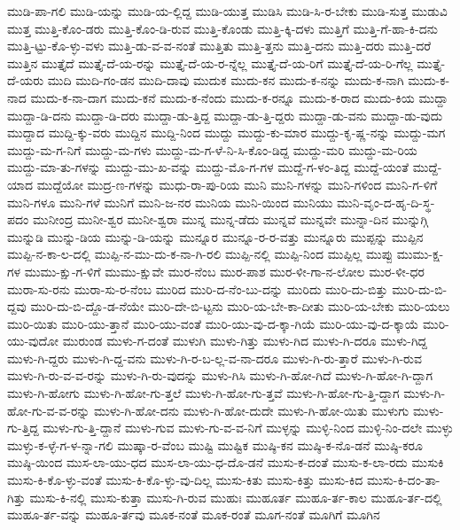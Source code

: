 {ಮುಡಿ-ಪಾ-ಗಲಿ
ಮುಡಿ-ಯನ್ನು
ಮುಡಿ-ಯ-ಲ್ಲಿದ್ದ
ಮುಡಿ-ಯುತ್ತ
ಮುಡಿಸಿ
ಮುಡಿ-ಸಿ-ರ-ಬೇಕು
ಮುಡಿ-ಸುತ್ತ
ಮುಡುವಿ
ಮುತ್ತ
ಮುತ್ತಿ-ಕೊಂ-ಡರು
ಮುತ್ತಿ-ಕೊಂ-ಡಿ-ರುವ
ಮುತ್ತಿ-ಕೊಂಡು
ಮುತ್ತಿ-ಕ್ಕಿ-ದಳು
ಮುತ್ತಿಗೆ
ಮುತ್ತಿ-ಗೆ-ಹಾ-ಕಿ-ದನು
ಮುತ್ತಿ-ಟ್ಟು-ಕೊ-ಳ್ಳು-ವಳು
ಮುತ್ತಿ-ಡು-ವ-ವ-ನಂತೆ
ಮುತ್ತಿತು
ಮುತ್ತಿ-ತ್ತನು
ಮುತ್ತಿ-ದನು
ಮುತ್ತಿ-ದರು
ಮುತ್ತಿ-ದರೆ
ಮುತ್ತಿನ
ಮುತ್ತೈದೆ
ಮುತ್ತೈ-ದೆ-ಯ-ರನ್ನು
ಮುತ್ತೈ-ದೆ-ಯ-ರ-ನ್ನೆಲ್ಲ
ಮುತ್ತೈ-ದೆ-ಯ-ರಿಗೆ
ಮುತ್ತೈ-ದೆ-ಯ-ರಿ-ಗೆಲ್ಲ
ಮುತ್ತೈ-ದೆ-ಯರು
ಮುದಿ
ಮುದಿ-ಗಂ-ಡನ
ಮುದಿ-ದಾವು
ಮುದುಕ
ಮುದು-ಕನ
ಮುದು-ಕ-ನನ್ನು
ಮುದು-ಕ-ನಾಗಿ
ಮುದು-ಕ-ನಾದ
ಮುದು-ಕ-ನಾ-ದಾಗ
ಮುದು-ಕನೆ
ಮುದು-ಕ-ನೆಂದು
ಮುದು-ಕ-ರನ್ನೂ
ಮುದು-ಕ-ರಾದ
ಮುದು-ಕಿಯ
ಮುದ್ದಾ
ಮುದ್ದಾ-ಡಿ-ದನು
ಮುದ್ದಾ-ಡಿ-ದರು
ಮುದ್ದಾ-ಡು-ತ್ತಿದ್ದ
ಮುದ್ದಾ-ಡು-ತ್ತಿ-ದ್ದರು
ಮುದ್ದಾ-ಡು-ವನು
ಮುದ್ದಾ-ಡು-ವುದು
ಮುದ್ದಾದ
ಮುದ್ದಿ-ಕ್ಕು-ವರು
ಮುದ್ದಿನ
ಮುದ್ದಿ-ನಿಂದ
ಮುದ್ದು
ಮುದ್ದು-ಕು-ಮಾರ
ಮುದ್ದು-ಕೃ-ಷ್ಣ-ನನ್ನು
ಮುದ್ದು-ಮಗ
ಮುದ್ದು-ಮ-ಗ-ನಿಗೆ
ಮುದ್ದು-ಮ-ಗಳು
ಮುದ್ದು-ಮ-ಗ-ಳೆ-ನಿ-ಸಿ-ಕೊಂ-ಡಿದ್ದ
ಮುದ್ದು-ಮರಿ
ಮುದ್ದು-ಮ-ರಿಯ
ಮುದ್ದು-ಮಾ-ತು-ಗಳನ್ನು
ಮುದ್ದು-ಮು-ಖ-ವನ್ನು
ಮುದ್ದು-ಮೊ-ಗ-ಗಳ
ಮುದ್ದೆ-ಗ-ಳಂ-ತಿದ್ದ
ಮುದ್ದೆ-ಯಂತೆ
ಮುದ್ದೆ-ಯಾದ
ಮುದ್ದೆಯೋ
ಮುದ್ರ-ಣ-ಗಳನ್ನು
ಮುಧು-ರಾ-ಪು-ರಿಯ
ಮುನಿ
ಮುನಿ-ಗಳನ್ನು
ಮುನಿ-ಗಳಿಂದ
ಮುನಿ-ಗ-ಳಿಗೆ
ಮುನಿ-ಗಳೂ
ಮುನಿ-ಗಳೆ
ಮುನಿಗೆ
ಮುನಿ-ಜ-ನರ
ಮುನಿಯ
ಮುನಿ-ಯಿಂದ
ಮುನಿಯು
ಮುನಿ-ವೃಂ-ದ-ಹೃ-ದಿ-ಸ್ಥ-ಪದಂ
ಮುನೀಂದ್ರ
ಮುನೀ-ಶ್ವರ
ಮುನೀ-ಶ್ವರಾ
ಮುನ್ನ
ಮುನ್ನ-ಡೆದು
ಮುನ್ನವೆ
ಮುನ್ನವೇ
ಮುನ್ನಾ-ದಿನ
ಮುನ್ನುಗ್ಗಿ
ಮುನ್ನುಡಿ
ಮುನ್ನು-ಡಿಯ
ಮುನ್ನು-ಡಿ-ಯನ್ನು
ಮುನ್ನೂರ
ಮುನ್ನೂ-ರ-ರ-ವತ್ತು
ಮುನ್ನೂರು
ಮುಪ್ಪನ್ನು
ಮುಪ್ಪಿನ
ಮುಪ್ಪಿ-ನ-ಕಾ-ಲ-ದಲ್ಲಿ
ಮುಪ್ಪಿ-ನ-ಮು-ದು-ಕ-ನಾ-ಗಿ-ರಲಿ
ಮುಪ್ಪಿ-ನಲ್ಲಿ
ಮುಪ್ಪಿ-ನಿಂದ
ಮುಪ್ಪಿಲ್ಲ
ಮುಪ್ಪು
ಮುಮು-ಕ್ಷ-ಗಳ
ಮುಮು-ಕ್ಷು-ಗ-ಳಿಗೆ
ಮುಮು-ಕ್ಷುವೇ
ಮುರ-ನೆಂಬ
ಮುರ-ಪಾಶ
ಮುರ-ಳೀ-ಗಾ-ನ-ಲೋಲ
ಮುರ-ಳೀ-ಧರ
ಮುರಾ-ಸು-ರನು
ಮುರಾ-ಸು-ರ-ನೆಂಬ
ಮುರಿದ
ಮುರಿ-ದ-ನೆಂ-ಬು-ದನ್ನು
ಮುರಿದು
ಮುರಿ-ದು-ಬಿತ್ತು
ಮುರಿ-ದು-ಬಿ-ದ್ದವು
ಮುರಿ-ದು-ಬಿ-ದ್ದೊ-ಡ-ನೆಯೇ
ಮುರಿ-ದೇ-ಬಿ-ಟ್ಟನು
ಮುರಿ-ಯ-ಬೇ-ಕಾ-ದೀತು
ಮುರಿ-ಯ-ಬೇಕು
ಮುರಿ-ಯಲು
ಮುರಿ-ಯಿತು
ಮುರಿ-ಯು-ತ್ತಾನೆ
ಮುರಿ-ಯು-ವಂತೆ
ಮುರಿ-ಯು-ವು-ದ-ಕ್ಕಾ-ಗಿಯೆ
ಮುರಿ-ಯು-ವು-ದ-ಕ್ಕಾಯೆ
ಮುರಿ-ಯು-ವುದೋ
ಮುರುಂಡ
ಮುಳು-ಗ-ದಂತೆ
ಮುಳುಗಿ
ಮುಳು-ಗಿತ್ತು
ಮುಳು-ಗಿದ
ಮುಳು-ಗಿ-ದರೂ
ಮುಳು-ಗಿದ್ದ
ಮುಳು-ಗಿ-ದ್ದರು
ಮುಳು-ಗಿ-ದ್ದ-ವನು
ಮುಳು-ಗಿ-ರ-ಬ-ಲ್ಲ-ವ-ನಾ-ದರೂ
ಮುಳು-ಗಿ-ರು-ತ್ತಾರೆ
ಮುಳು-ಗಿ-ರುವ
ಮುಳು-ಗಿ-ರು-ವ-ವ-ರನ್ನು
ಮುಳು-ಗಿ-ರು-ವುದನ್ನು
ಮುಳು-ಗಿಸಿ
ಮುಳು-ಗಿ-ಹೋ-ಗಿದೆ
ಮುಳು-ಗಿ-ಹೋ-ಗಿ-ದ್ದಾಗ
ಮುಳು-ಗಿ-ಹೋಗು
ಮುಳು-ಗಿ-ಹೋ-ಗು-ತ್ತಲೆ
ಮುಳು-ಗಿ-ಹೋ-ಗು-ತ್ತವೆ
ಮುಳು-ಗಿ-ಹೋ-ಗು-ತ್ತಿ-ದ್ದಾಗ
ಮುಳು-ಗಿ-ಹೋ-ಗು-ವ-ವ-ರನ್ನು
ಮುಳು-ಗಿ-ಹೋ-ದನು
ಮುಳು-ಗಿ-ಹೋ-ದುದೇ
ಮುಳು-ಗಿ-ಹೋ-ಯಿತು
ಮುಳುಗು
ಮುಳು-ಗು-ತ್ತಿದ್ದ
ಮುಳು-ಗು-ತ್ತಿ-ದ್ದಾನೆ
ಮುಳು-ಗುವ
ಮುಳು-ಗು-ವ-ವ-ನಿಗೆ
ಮುಳ್ಳನ್ನು
ಮುಳ್ಳಿ-ನಿಂದ
ಮುಳ್ಳಿ-ನಿಂ-ದಲೇ
ಮುಳ್ಳು
ಮುಳ್ಳು-ಕ-ಳ್ಳೆ-ಗ-ಳ-ನ್ನಾ-ಗಲಿ
ಮುಷ್ಕಾ-ರ-ವೆಂಬ
ಮುಷ್ಟಿ
ಮುಷ್ಟಿಕ
ಮುಷ್ಠಿ-ಕನ
ಮುಷ್ಠಿ-ಕ-ನೊ-ಡನೆ
ಮುಷ್ಠಿ-ಕರೂ
ಮುಷ್ಠಿ-ಯಿಂದ
ಮುಸ-ಲಾ-ಯು-ಧದ
ಮುಸ-ಲಾ-ಯು-ಧ-ದೊ-ಡನೆ
ಮುಸು-ಕ-ದಂತೆ
ಮುಸು-ಕ-ಲಾ-ರದು
ಮುಸುಕಿ
ಮುಸು-ಕಿ-ಕೊ-ಳ್ಳು-ವಂತೆ
ಮುಸು-ಕಿ-ಕೊ-ಳ್ಳು-ವು-ದಿಲ್ಲ
ಮುಸು-ಕಿತು
ಮುಸು-ಕಿತ್ತು
ಮುಸು-ಕಿದ
ಮುಸು-ಕಿ-ದಂ-ತಾ-ಗಿತ್ತು
ಮುಸು-ಕಿ-ನಲ್ಲಿ
ಮುಸು-ಕುತ್ತಾ
ಮುಸು-ಗಿ-ರುವ
ಮುಹುಃ
ಮುಹೂರ್ತ
ಮುಹೂ-ರ್ತ-ಕಾಲ
ಮುಹೂ-ರ್ತ-ದಲ್ಲಿ
ಮುಹೂ-ರ್ತ-ವನ್ನು
ಮುಹೂ-ರ್ತವು
ಮೂಕ-ನಂತೆ
ಮೂಕ-ರಂತೆ
ಮೂಗ-ನಂತೆ
ಮೂಗಿಗೆ
ಮೂಗಿನ
}
